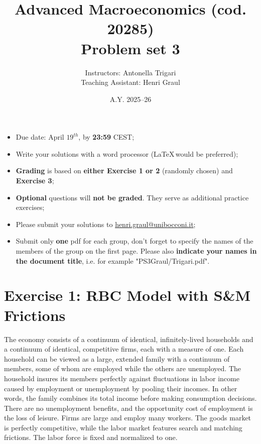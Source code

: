 \documentclass[a4paper,11pt]{article}
\begin{document}
\title{Advanced Macroeconomics (cod. 20285) \\ \textbf{Problem set 3}}

\date{A.Y. 2025--26}

\author{Instructors: Antonella Trigari\\
Teaching Assistant: Henri Graul}
\maketitle
\begin{itemize}
\item Due date: April $19^{th}$, by \textbf{23:59} CEST;

\item Write your solutions with a word processor (\LaTeX$\,$would be preferred);

\item \textbf{Grading} is based on \textbf{either Exercise 1 or 2} (randomly chosen) and \textbf{Exercise 3};

\item \textbf{Optional} questions will \textbf{not be graded}. They serve as additional practice exercises; 

\item Please submit your solutions to \href{mailto:henri.graul@unibocconi.it}{henri.graul@unibocconi.it};

\item Submit only \textbf{one} pdf for each group, don't forget to specify the names of the members of the group on the first page. Please also \textbf{indicate your names in the document title}, i.e. for example "PS3Graul/Trigari.pdf".     
\end{itemize}

\bigskip


\section*{Exercise 1: RBC Model with S\&M Frictions}

The economy consists of a continuum of identical, infinitely-lived households and a continuum of identical, competitive firms, each with a measure of one. Each household can be viewed as a large, extended family with a continuum of members, some of whom are employed while the others are unemployed. The household insures its members perfectly against fluctuations in labor income caused by employment or unemployment by pooling their incomes. In other words, the family combines its total income before making consumption decisions. There are no unemployment benefits, and the opportunity cost of employment is the loss of leisure. Firms are large and employ many workers. The goods market is perfectly competitive, while the labor market features search and matching frictions. The labor force is fixed and normalized to one.
\end{document}
